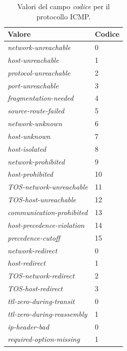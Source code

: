 \begin{table}[!htb]
  \centering
  \footnotesize
  \begin{tabular}{|l|l|}
    \hline
    \textbf{Valore}&\textbf{Codice}\\
    \hline
    \hline
    \textit{network-unreachable}      &0\\
    \textit{host-unreachable}         &1\\
    \textit{protocol-unreachable}     &2\\
    \textit{port-unreachable}         &3 \\
    \textit{fragmentation-needed}     &4\\
    \textit{source-route-failed}      &5\\
    \textit{network-unknown}          &6\\
    \textit{host-unknown}             &7\\
    \textit{host-isolated}            &8\\
    \textit{network-prohibited}       &9\\
    \textit{host-prohibited}          &10 \\
    \textit{TOS-network-unreachable}  &11 \\
    \textit{TOS-host-unreachable}     &12 \\
    \textit{communication-prohibited} &13 \\
    \textit{host-precedence-violation}&14 \\
    \textit{precedence-cutoff}        &15 \\
    \hline
    \textit{network-redirect}         &0  \\
    \textit{host-redirect}            &1  \\
    \textit{TOS-network-redirect}     &2  \\
    \textit{TOS-host-redirect}        &3  \\
    \hline
    \textit{ttl-zero-during-transit}  &0 \\
    \textit{ttl-zero-during-reassembly}&1 \\
    \hline
    \textit{ip-header-bad}            &0 \\
    \textit{required-option-missing}  &1 \\
    \hline
  \end{tabular}
  \caption{Valori del campo \textsl{codice} per il protocollo ICMP.}
\label{tab:ICMP_code}
\end{table}


